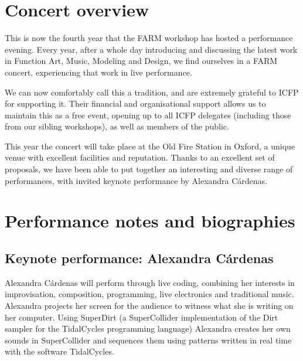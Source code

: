 \documentclass[sigplan,10pt,review]{acmart}\settopmatter{printfolios=true}
\begin{document}

\maketitle

\section{Concert overview}

This is now the fourth year that the FARM workshop has hosted a
performance evening. Every year, after a whole day introducing and
discussing the latest work in Function Art, Music, Modeling and
Design, we find ourselves in a FARM concert, experiencing that work in
live performance. 

We can now comfortably call this a tradition, and are extremely
grateful to ICFP for supporting it. Their financial and organisational
support allows us to maintain this as a free event, opening up to all
ICFP delegates (including those from our sibling workshops), as well
as members of the public.

This year the concert will take place at the Old Fire Station in
Oxford, a unique venue with excellent facilities and
reputation. Thanks to an excellent set of proposals, we have been able
to put together an interesting and diverse range of performances, with
invited keynote performance by Alexandra C\'{a}rdenas.

\section{Performance notes and biographies}

\subsection{Keynote performance: Alexandra C\'ardenas}

Alexandra C\'{a}rdenas will perform through live coding, combining her
interests in improvisation, composition, programming, live electronics
and traditional music. Alexandra projects her screen for the audience
to witness what she is writing on her computer. Using SuperDirt (a
SuperCollider implementation of the Dirt sampler for the TidalCycles
programming language) Alexandra creates her own sounds in
SuperCollider and sequences them using patterns written in real time
with the software TidalCycles.
\end{document}
